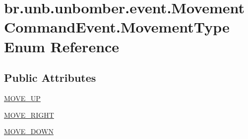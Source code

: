 \hypertarget{enumbr_1_1unb_1_1unbomber_1_1event_1_1_movement_command_event_1_1_movement_type}{\section{br.\+unb.\+unbomber.\+event.\+Movement\+Command\+Event.\+Movement\+Type Enum Reference}
\label{enumbr_1_1unb_1_1unbomber_1_1event_1_1_movement_command_event_1_1_movement_type}
}
\subsection*{Public Attributes}
\begin{DoxyCompactItemize}
\item 
\hyperlink{enumbr_1_1unb_1_1unbomber_1_1event_1_1_movement_command_event_1_1_movement_type_a7034b5391ac60699e4d2856185fc1070}{M\+O\+V\+E\+\_\+\+U\+P}
\item 
\hyperlink{enumbr_1_1unb_1_1unbomber_1_1event_1_1_movement_command_event_1_1_movement_type_a3016bd1446377ca32b14d10c011c523d}{M\+O\+V\+E\+\_\+\+R\+I\+G\+H\+T}
\item 
\hyperlink{enumbr_1_1unb_1_1unbomber_1_1event_1_1_movement_command_event_1_1_movement_type_a797bdd37087ea0494a9c00de622ae937}{M\+O\+V\+E\+\_\+\+D\+O\+W\+N}
\end{DoxyCompactItemize}



